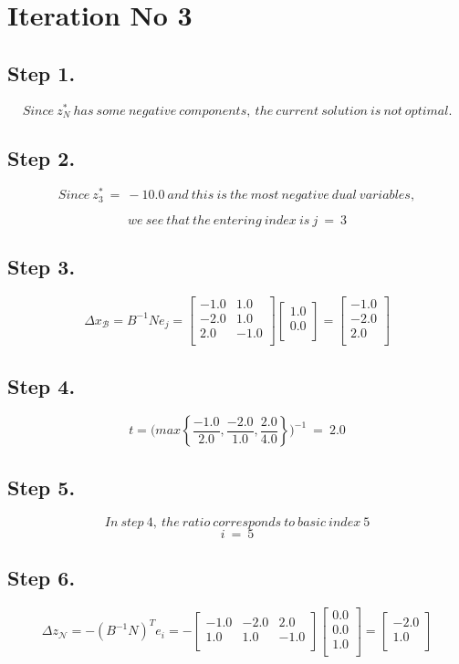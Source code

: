 \documentclass [12pt] {article}
\begin{document}
\section*{Iteration No 3}
\subsection{Step 1.}
\[
Since\ z_\mathit{N}^*\ has\ some\ negative\ components,\ the\ current\ solution\ is\ not\ optimal.
\]
\subsection{Step 2.}
\[
Since\ z_3^*\ = \ -10.0\ and\ this\ is\ the\ most\ negative\ dual\ variables,
\]

\[
we\ see\ that\ the\ entering\ index\ is\  j\ =\ 3
\]
\subsection{Step 3.}
\[
\Delta x_{\mathcal B} = B^{-1} N e_j =
\begin{bmatrix}
-1.0 & 1.0 \\ -2.0 & 1.0 \\ 2.0 & -1.0 \\ 
\end{bmatrix}
\begin{bmatrix}
1.0 \\ 0.0 \\ 
\end{bmatrix}
= \begin{bmatrix}
-1.0 \\ -2.0 \\ 2.0 \\ 
\end{bmatrix}
\]
\subsection{Step 4.}
\[
t =\Bigg(
max \left\{\frac{-1.0}{2.0},\frac{-2.0}{1.0},\frac{2.0}{4.0}\right\}
\Bigg)^{-1}\ =\ 2.0
\]
\subsection{Step 5.}
\[
In\ step\ 4, \ the\ ratio\ corresponds\ to\ basic\ index\ 5
\]
\[
i\ = \ 5
\]
\subsection{Step 6.}
\[
\Delta z_{\mathcal N}= -( B^{-1} N )^{T}e_i = -\begin{bmatrix}
-1.0 & -2.0 & 2.0 \\ 1.0 & 1.0 & -1.0 \\ 
\end{bmatrix}
\begin{bmatrix}
0.0 \\ 0.0 \\ 1.0 \\ 
\end{bmatrix}
= \begin{bmatrix}
-2.0 \\ 1.0 \\ 
\end{bmatrix}
\]
\end{document}
